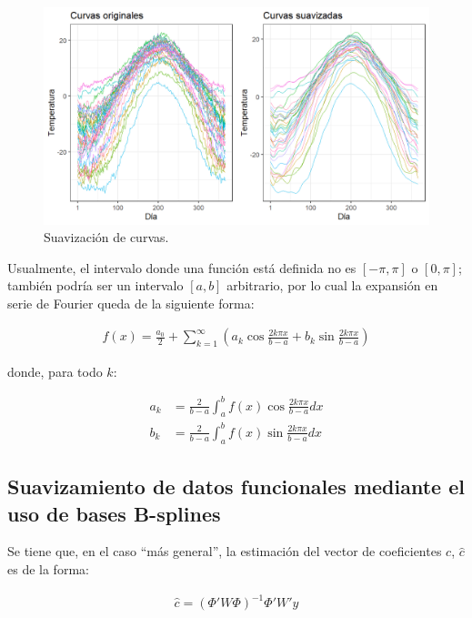 \documentclass[
]{book}
\begin{document}
\begin{figure}
\includegraphics[width=17.78in]{figuras/otros/suves_fda} \caption{Suavización de curvas.}\label{fig:suaves}
\end{figure}

Usualmente, el intervalo donde una función está definida no es \([-\pi,\pi]\) o \([0,\pi]\); también podría ser un intervalo \([a,b]\) arbitrario, por lo cual la expansión en serie de Fourier queda de la siguiente forma:

\begin{align*}
    f(x)=\frac{a_0}{2}+\sum_{k=1}^\infty\left(a_k\cos{\frac{2k\pi x}{b-a}} + b_k\sin{\frac{2k\pi x}{b-a}} \right)
\end{align*}

donde, para todo \(k\):

\begin{align*}
    a_k&=\frac{2}{b-a}\int_a^bf(x)\cos{\frac{2k\pi x}{b-a}}dx\\
    b_k&=\frac{2}{b-a}\int_a^bf(x)\sin{\frac{2k\pi x}{b-a}}dx
\end{align*}

\hypertarget{suavizamiento-de-datos-funcionales-mediante-el-uso-de-bases-b-splines}{%
\subsection*{Suavizamiento de datos funcionales mediante el uso de bases B-splines}\label{suavizamiento-de-datos-funcionales-mediante-el-uso-de-bases-b-splines}}

Se tiene que, en el caso ``más general'', la estimación del vector de coeficientes \(c\), \(\hat{c}\) es de la forma:

\begin{align*}
    \hat{c}=(\Phi'W\Phi)^{-1}\Phi'W'y
\end{align*}
\end{document}
